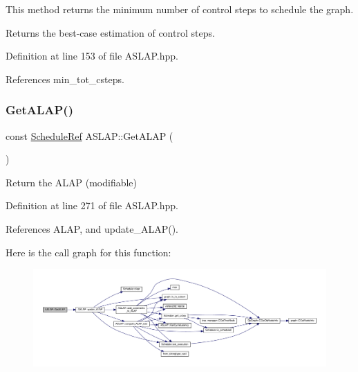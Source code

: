 This method returns the minimum number of control steps to schedule the graph. 

\begin{DoxyReturn}{Returns}
the best-\/case estimation of control steps. 
\end{DoxyReturn}


Definition at line 153 of file A\+S\+L\+A\+P.\+hpp.



References min\+\_\+tot\+\_\+csteps.

\mbox{\label{classASLAP_aaaa8fac60ae1b268a8bb7de6f2b83032}} 
\subsubsection{\texorpdfstring{Get\+A\+L\+A\+P()}{GetALAP()}}
{\footnotesize\ttfamily const \hyperlink{schedule_8hpp_af67f402958b3b52a1ec5cc4ce08ae3b9}{Schedule\+Ref} A\+S\+L\+A\+P\+::\+Get\+A\+L\+AP (\begin{DoxyParamCaption}{ }\end{DoxyParamCaption})\hspace{0.3cm}{\ttfamily [inline]}}



Return the A\+L\+AP (modifiable) 



Definition at line 271 of file A\+S\+L\+A\+P.\+hpp.



References A\+L\+AP, and update\+\_\+\+A\+L\+A\+P().

Here is the call graph for this function\+:
\nopagebreak
\begin{figure}[H]
\begin{center}
\leavevmode
\includegraphics[width=350pt]{d9/d2a/classASLAP_aaaa8fac60ae1b268a8bb7de6f2b83032_cgraph}
\end{center}
\end{figure}
\mbox{\label{classASLAP_ac0629687f10668f95901bc157bdd7d49}} 
